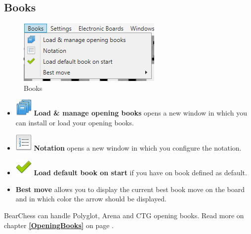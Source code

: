 \documentclass[11pt,a4paper]{article}
\begin{document}
	\subsection{Books}
	\begin{figure}[H]
		\centering
		\includegraphics[scale=1.0]{Books.png}
		\caption{Books}
		\label{fig:Books}
	\end{figure}
	\begin{itemize}
		\item \includegraphics[scale=0.5]{books_stack.png} \textbf{Load \& manage opening books} opens a new window in which you can install or load  your opening books.
		\item \includegraphics[scale=0.5]{text_list_numbers.png} \textbf{Notation} opens a new window in which you configure the notation.
		\item \includegraphics[scale=0.5]{tick.png} \textbf{Load default book on start} if you have on book defined as default.
		\item \textbf{Best move} allows you to display the current best book move on the board and in which color the arrow should be displayed.
	\end{itemize}
	BearChess can handle Polyglot, Arena and CTG opening books. Read more on chapter \textbf{\ref{OpeningBooks}  } on page \pageref{OpeningBooks}.
	
\end{document}
